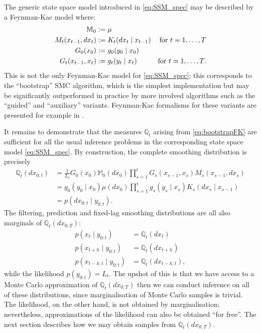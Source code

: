 The generic state space model introduced in \eqref{eq:SSM_spec} may be described by a Feynman-Kac model where:
\begin{align}
\mathbb{M}_0 &:= \mu \notag\\
M_t (x_{t-1}, dx_t) &:= K_t (dx_t \mid x_{t-1}) & \text{for } t=1,\dots,T \notag\\
G_0 (x_0) &:= g_0 ( y_0 \mid x_0 ) \notag\\
G_t (x_{t-1}, x_t) &:= g_t( y_t \mid x_t ) & \text{for } t=1,\dots,T . \label{eq:bootstrapFK}
\end{align}
This is not the only Feynman-Kac model for \eqref{eq:SSM_spec}; this corresponds to the ``bootstrap'' SMC algorithm, which is the simplest implementation but may be significantly outperformed in practice by more involved algorithms such as the ``guided''\seb{[citation]} and ``auxiliary'' \parencite{pitt1999, carpenter1999} variants. Feynman-Kac formalisms for these variants are presented for example in \textcite[Section 5.1.2]{chopin2020}.

It remains to demonstrate that the measures $\mathbb{Q}_t$ arising from \eqref{eq:bootstrapFK} are sufficient for all the usual inference problems in the corresponding state space model \eqref{eq:SSM_spec}.
By construction, the complete smoothing distribution is precisely
\begin{align*}
\mathbb{Q}_t (dx_{0:t})
&= \frac{1}{L_t} G_0(x_0) \mathbb{M}_0(dx_0)
        \prod_{s=1}^t G_s(x_{s-1}, x_s) M_s(x_{s-1}, dx_s) \\
&= g_0(y_0 \mid x_0) \mu(dx_0) 
        \prod_{s=1}^t g_s(y_s \mid x_s) K_s(dx_s \mid x_{s-1}) \\
&= p(dx_{0:t} \mid y_{0:t}) .
\end{align*}
The filtering, prediction and fixed-lag smoothing distributions are all also marginals of $\mathbb{Q}_t(dx_{0:T})$:
\begin{align*}
p(x_t \mid y_{0:t}) &= \mathbb{Q}_t (dx_t) \\
p(x_{t+h} \mid y_{0:t}) &= \mathbb{Q}_t (dx_{t+h}) \\
p(x_{t-h:t} \mid y_{0:t}) &= \mathbb{Q}_t (dx_{t-h:t}) ,
\end{align*}
while the likelihood $p(y_{0:t}) = L_t$.
The upshot of this is that we have access to a Monte Carlo approximation of $\mathbb{Q}_t(dx_{0:T})$ then we can conduct inference on all of these distributions, since marginalisation of Monte Carlo samples is trivial. The likelihood, on the other hand, is not obtained by marginalisation; nevertheless, approximations of the likelihood can also be obtained ``for free''. 
The next section describes how we may obtain samples from $\mathbb{Q}_t(dx_{0:T})$.




